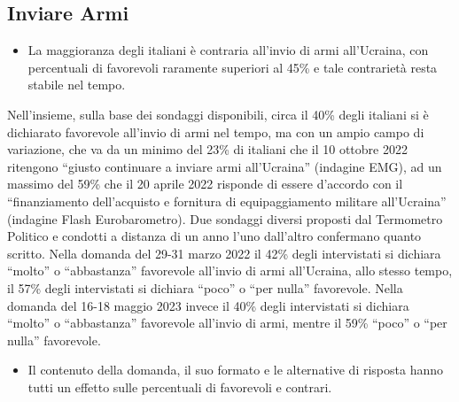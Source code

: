 \documentclass[
  openany]{book}
\providecommand{\tightlist}{%
  \setlength{\itemsep}{0pt}\setlength{\parskip}{0pt}}
\begin{document}
\hypertarget{inviare-armi}{%
\subsection{Inviare Armi}\label{inviare-armi}}

\begin{itemize}
\tightlist
\item
  La maggioranza degli italiani è contraria all'invio di armi all'Ucraina, con percentuali di favorevoli raramente superiori al 45\% e tale contrarietà resta stabile nel tempo.
\end{itemize}

Nell'insieme, sulla base dei sondaggi disponibili, circa il 40\% degli italiani si è dichiarato favorevole all'invio di armi nel tempo, ma con un ampio campo di variazione, che va da un minimo del 23\% di italiani che il 10 ottobre 2022 ritengono ``giusto continuare a inviare armi all'Ucraina'' (indagine EMG), ad un massimo del 59\% che il 20 aprile 2022 risponde di essere d'accordo con il ``finanziamento dell'acquisto e fornitura di equipaggiamento militare all'Ucraina'' (indagine Flash Eurobarometro). Due sondaggi diversi proposti dal Termometro Politico e condotti a distanza di un anno l'uno dall'altro confermano quanto scritto. Nella domanda del 29-31 marzo 2022 il 42\% degli intervistati si dichiara ``molto'' o ``abbastanza'' favorevole all'invio di armi all'Ucraina, allo stesso tempo, il 57\% degli intervistati si dichiara ``poco'' o ``per nulla'' favorevole. Nella domanda del 16-18 maggio 2023 invece il 40\% degli intervistati si dichiara ``molto'' o ``abbastanza'' favorevole all'invio di armi, mentre il 59\% ``poco'' o ``per nulla'' favorevole.

\begin{itemize}
\tightlist
\item
  Il contenuto della domanda, il suo formato e le alternative di risposta hanno tutti un effetto sulle percentuali di favorevoli e contrari.
\end{itemize}
\end{document}
